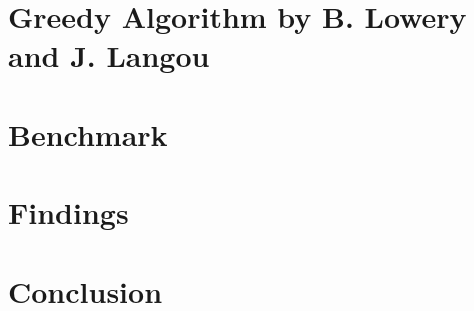 \documentclass{article}
\begin{document}
\section{Greedy Algorithm by B. Lowery and J. Langou}

\section{Benchmark}

\section{Findings}

\section{Conclusion}



\end{document}
